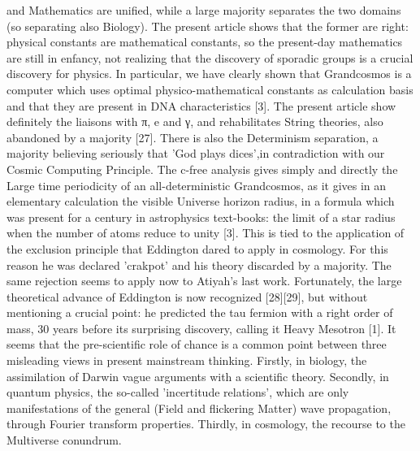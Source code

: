 and Mathematics are unified, while a large majority separates the two domains (so separating also
Biology). The present article shows that the former are right: physical constants are mathematical
constants, so the present-day mathematics are still in enfancy, not realizing that the discovery of
sporadic groups is a crucial discovery for physics. In particular, we have clearly shown that
Grandcosmos is a computer which uses optimal physico-mathematical constants as calculation basis
and that they are present in DNA characteristics [3]. The present article show definitely the liaisons
with π, e and γ, and rehabilitates String theories, also abandoned by a majority [27].
There is also the Determinism separation, a majority believing seriously that 'God plays dices',in contradiction with our Cosmic Computing Principle. The c-free analysis gives simply and
directly the Large time periodicity of an all-deterministic Grandcosmos, as it gives in an elementary
calculation the visible Universe horizon radius, in a formula which was present for a century in
astrophysics text-books: the limit of a star radius when the number of atoms reduce to unity [3].
This is tied to the application of the exclusion principle that Eddington dared to apply in cosmology.
For this reason he was declared 'crakpot' and his theory discarded by a majority. The same rejection
seems to apply now to Atiyah's last work. Fortunately, the large theoretical advance of Eddington is
now recognized [28][29], but without mentioning a crucial point: he predicted the tau fermion with
a right order of mass, 30 years before its surprising discovery, calling it Heavy Mesotron [1].
It seems that the pre-scientific role of chance is a common point between three misleading views
in present mainstream thinking. Firstly, in biology, the assimilation of Darwin vague arguments
with a scientific theory. Secondly, in quantum physics, the so-called 'incertitude relations', which are
only manifestations of the general (Field and flickering Matter) wave propagation, through Fourier
transform properties. Thirdly, in cosmology, the recourse to the Multiverse conundrum.
